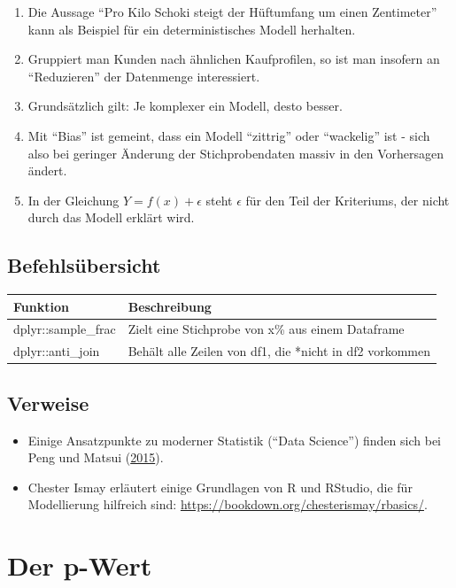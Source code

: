 \documentclass[12pt,ngerman,]{book}
\providecommand{\tightlist}{%
  \setlength{\itemsep}{0pt}\setlength{\parskip}{0pt}}
\begin{document}
\begin{enumerate}
\def\labelenumi{\arabic{enumi}.}
\tightlist
\item
  Die Aussage ``Pro Kilo Schoki steigt der Hüftumfang um einen
  Zentimeter'' kann als Beispiel für ein deterministisches Modell
  herhalten.
\item
  Gruppiert man Kunden nach ähnlichen Kaufprofilen, so ist man insofern
  an ``Reduzieren'' der Datenmenge interessiert.
\item
  Grundsätzlich gilt: Je komplexer ein Modell, desto besser.
\item
  Mit ``Bias'' ist gemeint, dass ein Modell ``zittrig'' oder
  ``wackelig'' ist - sich also bei geringer Änderung der
  Stichprobendaten massiv in den Vorhersagen ändert.
\item
  In der Gleichung \(Y=f(x)+\epsilon\) steht \(\epsilon\) für den Teil
  der Kriteriums, der nicht durch das Modell erklärt wird.
\end{enumerate}

\section{Befehlsübersicht}\label{befehlsubersicht-5}

\begin{longtable}[]{@{}ll@{}}
\toprule
Funktion & Beschreibung\tabularnewline
\midrule
\endhead
dplyr::sample\_frac & Zielt eine Stichprobe von x\% aus einem
Dataframe\tabularnewline
dplyr::anti\_join & Behält alle Zeilen von df1, die *nicht in df2
vorkommen\tabularnewline
\bottomrule
\end{longtable}

\section{Verweise}\label{verweise-4}

\begin{itemize}
\item
  Einige Ansatzpunkte zu moderner Statistik (``Data Science'') finden
  sich bei Peng und Matsui (\protect\hyperlink{ref-peng2015art}{2015}).
\item
  Chester Ismay erläutert einige Grundlagen von R und RStudio, die für
  Modellierung hilfreich sind:
  \url{https://bookdown.org/chesterismay/rbasics/}.
\end{itemize}

\chapter{Der p-Wert}\label{der-p-wert}
\end{document}
